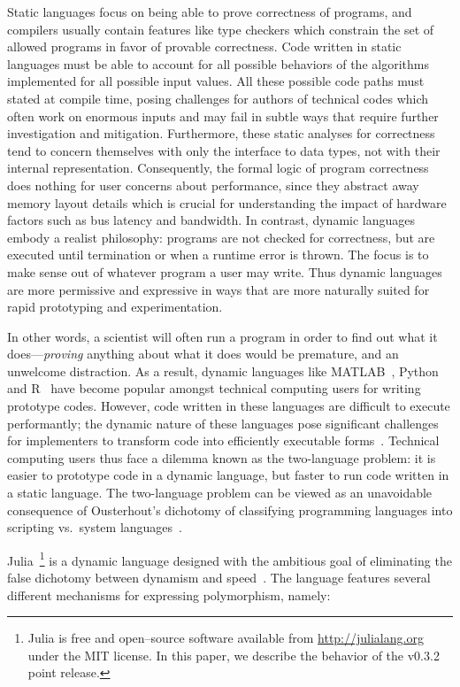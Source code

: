 \documentclass[pldi]{sigplanconf-pldi15}
\begin{document}
Static languages focus on being able to prove correctness of programs, and
compilers usually contain features like type checkers which constrain the set
of allowed programs in favor of provable correctness. Code written in static
languages must be able to account for all possible behaviors of the algorithms
implemented for all possible input values. All these possible code paths must
stated at compile time, posing challenges for authors of technical codes which
often work on enormous inputs and may fail in subtle ways that require further
investigation and mitigation. Furthermore, these static analyses for
correctness tend to concern themselves with only the interface to data types,
not with their internal representation. Consequently, the formal logic of
program correctness does nothing for user concerns about performance, since
they abstract away memory layout details which is crucial for understanding the
impact of hardware factors such as bus latency and bandwidth. In contrast,
dynamic languages embody a realist philosophy: programs are not checked for
correctness, but are executed until termination or when a runtime error is
thrown. The focus is to make sense out of whatever program a user may write.
Thus dynamic languages are more permissive and expressive in ways that are more
naturally suited for rapid prototyping and experimentation.

In other words, a scientist will often run a program in order to find out what
it does---\emph{proving} anything about what it does would be premature, and an
unwelcome distraction. As a result, dynamic languages like
MATLAB~\cite{matlab}, Python~\cite{pythonlib,pythonref} and R~\cite{rlang} have
become popular amongst technical computing users for writing prototype codes.
However, code written in these languages are difficult to execute performantly;
the dynamic nature of these languages pose significant challenges for
implementers to transform code into efficiently executable
forms~\cite{Joisha2001,Joisha2006,Seljebotn2009}. Technical computing users
thus face a dilemma known as the two-language problem: it is easier to
prototype code in a dynamic language, but faster to run code written in a
static language. The two-language problem can be viewed as an unavoidable
consequence of Ousterhout's dichotomy of classifying programming languages into
scripting vs.\ system languages~\cite{Ousterhout1998,Hoare2014}. 

Julia~\footnote{Julia is free and open--source software available from
\url{http://julialang.org} under the MIT license. In this paper, we describe
the behavior of the v0.3.2 point release.} is a dynamic language designed with
the ambitious goal of eliminating the false dichotomy between dynamism and
speed~\cite{Bezanson2012,Bezanson2014b}.  The language features several
different mechanisms for expressing polymorphism, namely:
\end{document}
